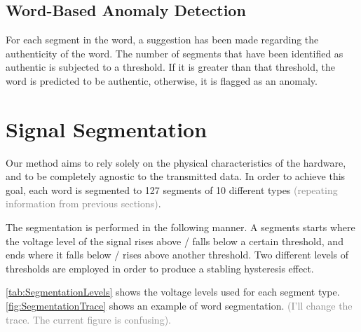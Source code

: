 \documentclass[conference]{IEEEtran}
\begin{document}
\subsection{Word-Based Anomaly Detection}
  For each segment in the word, a suggestion has been made regarding the authenticity of the word. The number of segments that have been identified as authentic is subjected to a threshold. If it is greater than that threshold, the word is predicted to be authentic, otherwise, it is flagged as an anomaly.
  
\section{Signal Segmentation}
  Our method aims to rely solely on the physical characteristics of the hardware, and to be completely agnostic to the transmitted data. In order to achieve this goal, each word is segmented to 127 segments of 10 different types \textcolor{gray}{(repeating information from previous sections)}.
  
  The segmentation is performed in the following manner. A segments starts where the voltage level of the signal rises above / falls below a certain threshold, and ends where it falls below / rises above another threshold. Two different levels of thresholds are employed in order to produce a stabling hysteresis effect.
  
  \ref{tab:SegmentationLevels} shows the voltage levels used for each segment type. \ref{fig:SegmentationTrace} shows an example of word segmentation. \textcolor{gray}{(I'll change the trace. The current figure is confusing).}
  
\end{document}
